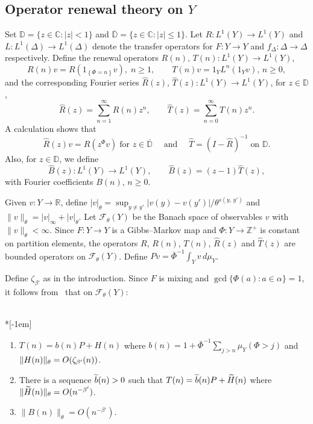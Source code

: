 \documentclass[AHL,Unicode,longabstracts,published]{cedram}
\newcommand{\R}{\mathbb{R}}
\newcommand{\Z}{\mathbb{Z}}
\newcommand{\CX}{\mathbb{C}}
\newcommand{\D}{\mathbb{D}}
\newcommand{\cF}{\mathcal{F}}
\newcommand{\hB}{\widehat{B}}
\newcommand{\hR}{\widehat{R}}
\newcommand{\hT}{\widehat{T}}
\newcommand{\tH}{\widetilde{H}}
\newcommand{\barD}{\overline{\D}}
\newcommand{\bPhi}{\bar{\Phi}}
\newcommand*{\alphenumi}{\renewcommand*{\theenumi}{\alph{enumi}}}
\let\oldtilde\tilde
\renewcommand*{\tilde}[1]{\mathchoice{\widetilde{#1}}{\widetilde{#1}}{\oldtilde{#1}}{\oldtilde{#1}}}
\begin{document}
\subsection{Operator renewal theory on \texorpdfstring{$Y$}{Y}}\label{sec:TR}

Set $\D=\{z\in\CX:|z|<1\}$ and $\barD=\{z\in\CX:|z|\le1\}$. Let $R:L^1(Y)\to L^1(Y)$ and $L:L^1(\Delta)\to L^1(\Delta)$ denote the transfer operators for $F:Y\to Y$ and $f_\Delta:\Delta\to\Delta$ respectively. Define the renewal operators $R(n),\,T(n):L^1(Y)\to L^1(Y)$,
\[
R(n)v=R\left(1_{\left\{\Phi=n\right\}}v\right),\;n\ge1,\qquad T(n)v=1_Y L^n(1_Y v),\,n\ge0,
\]
and the corresponding Fourier series $\hR(z),\,\hT(z):L^1(Y)\to L^1(Y)$, for $z\in\D$,
\[
\hR(z)=\sum_{n=1}^\infty R(n)z^n,\qquad
\hT(z)=\sum_{n=0}^\infty T(n)z^n.
\]
A calculation shows that
\[
\hR(z)v=R(z^\Phi v)\;
\text{for }z\in\barD\quad \text{ and }\quad \hT=(I-\hR)^{-1}\;\text{on }\D.
\]
Also, for $z\in\D$, we define
\[
\hB(z):L^1(Y)\to L^1(Y), \qquad \hB(z)=(z-1)\hT(z),
\]
with Fourier coefficients $B(n)$, $n\ge0$.

Given $v:Y\to\R$, define $|v|_\theta=\sup_{y\neq y'}|v(y)-v(y')|/\theta^{s(y,\,y')}$ and $\|v\|_\theta=|v|_\infty+|v|_\theta$. Let $\cF_\theta(Y)$ be the Banach space of observables $v$ with $\|v\|_\theta<\infty$. Since $F:Y\to Y$ is a Gibbs--Markov map and $\Phi:Y\to\Z^+$ is constant on partition elements, the operators $R$, $R(n)$, $T(n)$, $\hR(z)$ and $\hT(z)$ are bounded operators on $\cF_\theta(Y)$. Define $Pv=\bPhi^{-1}\int_Y v\,d\mu_Y$.

Define $\zeta_{\beta'}$ as in the introduction. Since $F$ is mixing and $\gcd\{\Phi(a):a\in\alpha\}=1$, it follows from~\cite{Gouezel04a} that on $\cF_\theta(Y)$:

\begin{lemm}\label{lem:Tn}\ \\*[-1em]

\begin{enumerate}\alphenumi
\item \label{lemm4.3.1}$T(n)=b(n)P+H(n)$ where $b(n)=1+\bPhi^{-1}\sum_{j>n}\mu_Y(\Phi>j)$ and $\|H(n)\|_\theta\linebreak=O(\zeta_{\beta'}(n))$.
\item \label{lemm4.3.2}There is a sequence $\tilde b(n)>0$ such that $T(n)=\tilde b(n)P+\tH(n)$ where $\|\tH(n)\|_\theta\linebreak=O(n^{-\beta'})$.
\item \label{lemm4.3.3}$\|B(n)\|_\theta=O(n^{-\beta'})$.
\end{enumerate}
\end{lemm}
\end{document}
